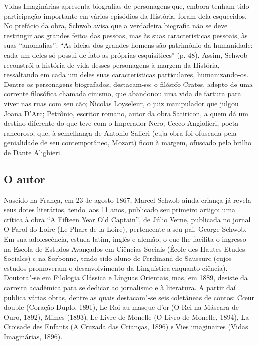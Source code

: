 \documentclass[12pt]{extarticle}
\begin{document}
Vidas Imaginárias apresenta biografias de personagens que, embora tenham
tido participação importante em vários episódios da História, foram dela
esquecidos. No prefácio da obra, Schwob avisa que a verdadeira biografia
não se deve restringir aos grandes feitos das pessoas, mas às suas
características pessoais, às suas ``anomalias'': ``As ideias dos grandes
homens são patrimônio da humanidade: cada um deles só possui de fato as
próprias esquisitices'' (p. 48). Assim, Schwob reconstrói a história de
vida desses personagens à margem da História, ressaltando em cada um
deles suas características particulares, humanizando-os. Dentre os
personagens biografados, destacam-se: o filósofo Crates, adepto de uma
corrente filosófica chamada cinismo, que abandonou uma vida de fartura
para viver nas ruas com seu cão; Nicolas Loyseleur, o juiz manipulador
que julgou Joana D'Arc; Petrônio, escritor romano, autor da obra
Satiricon, a quem dá um destino diferente do que teve com o Imperador
Nero; Cecco Angiolieri, poeta rancoroso, que, à semelhança de Antonio
Salieri (cuja obra foi ofuscada pela genialidade de seu contemporâneo,
Mozart) ficou à margem, ofuscado pelo brilho de Dante Alighieri.

\subsection{O autor}



Nascido na França, em 23 de agosto 1867, Marcel Schwob ainda criança já revela
seus dotes literários, tendo, aos 11 anos, publicado seu primeiro
artigo: uma crítica à obra ``A Fifteen Year Old Captain'', de Júlio Verne,
publicada no jornal O Farol do Loire (Le Phare de la Loire), pertencente
a seu pai, George Schwob. Em sua adolescência, estuda latim, inglês e
alemão, o que lhe facilita o ingresso na Escola de Estudos Avançados em
Ciências Sociais (École des Hautes Etudes Sociales) e na Sorbonne, tendo
sido aluno de Ferdinand de Saussure (cujos estudos promoveram o
desenvolvimento da Linguística enquanto ciência). Doutora"-se em
Filologia Clássica e Línguas Orientais, mas, em 1889, desiste da
carreira acadêmica para se dedicar ao jornalismo e à literatura. A
partir daí publica várias obras, dentre as quais destacam"-se seis
coletâneas de contos: Cœur double (Coração Duplo, 1891), Le Roi au
masque d'or (O Rei na Máscara de Ouro, 1892), Mimes (1893), Le Livre de
Monelle (O Livro de Monelle, 1894), La Croisade des Enfants (A Cruzada
das Crianças, 1896) e Vies imaginaires (Vidas Imaginárias, 1896).
\end{document}
